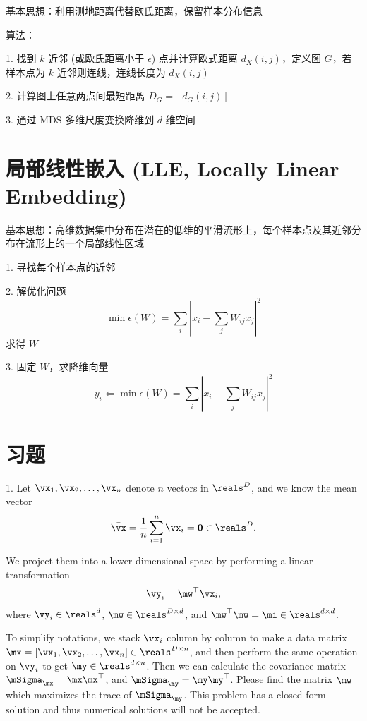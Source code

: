 \documentclass[openany]{ctexbook}
\theoremstyle{kaiti}
\theoremstyle{normal}
\begin{document}
基本思想：利用测地距离代替欧氏距离，保留样本分布信息

算法：

1. 找到 $k$ 近邻 (或欧氏距离小于 $\epsilon$) 点并计算欧式距离 $d_X\left(i,j \right)$，定义图 $G$，若样本点为 $k$ 近邻则连线，连线长度为 $d_X\left(i,j \right)$

2. 计算图上任意两点间最短距离 $D_G=\left[d_G\left(i,j \right)\right]$

3. 通过 MDS 多维尺度变换降维到 $d$ 维空间

\section{局部线性嵌入 (LLE, Locally Linear Embedding) }

基本思想：高维数据集中分布在潜在的低维的平滑流形上，每个样本点及其近邻分布在流形上的一个局部线性区域

1. 寻找每个样本点的近邻

2. 解优化问题
   \begin{equation}
   \min \epsilon \left(W \right)=\sum_i\left|x_i-\sum_jW_{ij}x_j\right|^2
   \end{equation} 
   求得 $W$

3. 固定 $W$，求降维向量
  \begin{equation}
  y_i\Leftarrow \min \epsilon \left(W \right)=\sum_i\left|x_i-\sum_jW_{ij}x_j\right|^2
  \end{equation}

\section{习题}


1. Let $\vx_1, \vx_2, \dots, \vx_n$ denote $n$ vectors in $\reals^D$, and we know the mean vector
\begin{equation}
  \bar{\vx}=\frac{1}{n}\sum_{i=1}^n\vx_i=\bm{0}\in\reals^D.
\end{equation}

We project them into a lower dimensional space by performing a linear transformation
\begin{equation}
  \vy_i=\mw^\top\vx_i,
\end{equation}
where $\vy_i\in\reals^d$, $\mw\in\reals^{D\times d}$, and $\mw^\top\mw=\mi\in\reals^{d\times d}$.

To simplify notations, we stack $\vx_i$ column by column to make a data matrix $\mx=[\vx_1, \vx_2, \ldots, \vx_n]\in\reals^{D\times n}$, and then perform the same operation on $\vy_i$ to get $\my\in\reals^{d\times n}$. Then we can calculate the covariance matrix $\mSigma_{\mx}=\mx\mx^\top$, and $\mSigma_{\my}=\my\my^\top$. Please find the matrix $\mw$ which maximizes the trace of $\mSigma_{\my}$. This problem has a closed-form solution and thus numerical solutions will not be accepted. 
\end{document}
